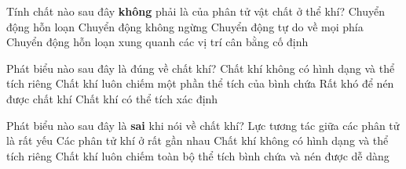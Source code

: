 \begin{ex}%
	Tính chất nào sau đây \textbf{không} phải là của phân tử vật chất ở thể khí?
	\choice
	{Chuyển động hỗn loạn}
	{Chuyển động không ngừng}
	{Chuyển động tự do về mọi phía}
	{\True Chuyển động hỗn loạn xung quanh các vị trí cân bằng cố định}
	\end{ex}



\begin{ex}%
	Phát biểu nào sau đây là đúng về chất khí?
	\choice
	{\True Chất khí không có hình dạng và thể tích riêng}
	{Chất khí luôn chiếm một phần thể tích của bình chứa}
	{Rất khó để nén được chất khí}
	{Chất khí có thể tích xác định}
	\end{ex}


\begin{ex}%
	Phát biểu nào sau đây là \textbf{sai} khi nói về chất khí?
	\choice
	{Lực tương tác giữa các phân tử là rất yếu}
	{\True Các phân tử khí ở rất gần nhau}
	{Chất khí không có hình dạng và thể tích riêng}
	{Chất khí luôn chiếm toàn bộ thể tích bình chứa và nén được dễ dàng}
	\end{ex}

